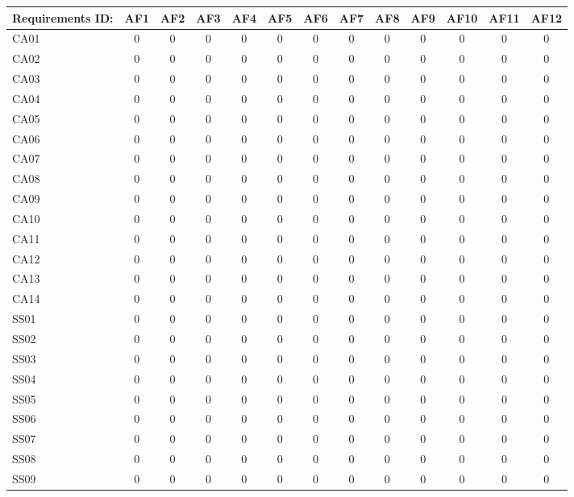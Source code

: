 \documentclass [10pt]{article}
\begin{document}
\begin{longtable}{ | p{} | c | c | c | c | c | c | c | c | c | c | c | c | }
\hline
	Requirements ID: & AF1 & AF2 & AF3 & AF4 & AF5 & AF6 & AF7 & AF8 & AF9 & AF10 & AF11 & AF12 \\ \hline
	CA01 & 0 & 0 & 0 & 0 & 0 & 0 & 0 & 0 & 0 & 0 & 0 & 0 \\ \hline
	CA02 & 0 & 0 & 0 & 0 & 0 & 0 & 0 & 0 & 0 & 0 & 0 & 0 \\ \hline
	CA03 & 0 & 0 & 0 & 0 & 0 & 0 & 0 & 0 & 0 & 0 & 0 & 0 \\ \hline
	CA04 & 0 & 0 & 0 & 0 & 0 & 0 & 0 & 0 & 0 & 0 & 0 & 0 \\ \hline
	CA05 & 0 & 0 & 0 & 0 & 0 & 0 & 0 & 0 & 0 & 0 & 0 & 0 \\ \hline
	CA06 & 0 & 0 & 0 & 0 & 0 & 0 & 0 & 0 & 0 & 0 & 0 & 0 \\ \hline
	CA07 & 0 & 0 & 0 & 0 & 0 & 0 & 0 & 0 & 0 & 0 & 0 & 0 \\ \hline
	CA08 & 0 & 0 & 0 & 0 & 0 & 0 & 0 & 0 & 0 & 0 & 0 & 0 \\ \hline
	CA09 & 0 & 0 & 0 & 0 & 0 & 0 & 0 & 0 & 0 & 0 & 0 & 0 \\ \hline
	CA10 & 0 & 0 & 0 & 0 & 0 & 0 & 0 & 0 & 0 & 0 & 0 & 0 \\ \hline
	CA11 & 0 & 0 & 0 & 0 & 0 & 0 & 0 & 0 & 0 & 0 & 0 & 0 \\ \hline
	CA12 & 0 & 0 & 0 & 0 & 0 & 0 & 0 & 0 & 0 & 0 & 0 & 0 \\ \hline
	CA13 & 0 & 0 & 0 & 0 & 0 & 0 & 0 & 0 & 0 & 0 & 0 & 0 \\ \hline
	CA14 & 0 & 0 & 0 & 0 & 0 & 0 & 0 & 0 & 0 & 0 & 0 & 0 \\ \hline
	SS01 & 0 & 0 & 0 & 0 & 0 & 0 & 0 & 0 & 0 & 0 & 0 & 0 \\ \hline
	SS02 & 0 & 0 & 0 & 0 & 0 & 0 & 0 & 0 & 0 & 0 & 0 & 0 \\ \hline
	SS03 & 0 & 0 & 0 & 0 & 0 & 0 & 0 & 0 & 0 & 0 & 0 & 0 \\ \hline
	SS04 & 0 & 0 & 0 & 0 & 0 & 0 & 0 & 0 & 0 & 0 & 0 & 0 \\ \hline
	SS05 & 0 & 0 & 0 & 0 & 0 & 0 & 0 & 0 & 0 & 0 & 0 & 0 \\ \hline
	SS06 & 0 & 0 & 0 & 0 & 0 & 0 & 0 & 0 & 0 & 0 & 0 & 0 \\ \hline
	SS07 & 0 & 0 & 0 & 0 & 0 & 0 & 0 & 0 & 0 & 0 & 0 & 0 \\ \hline
	SS08 & 0 & 0 & 0 & 0 & 0 & 0 & 0 & 0 & 0 & 0 & 0 & 0 \\ \hline
	SS09 & 0 & 0 & 0 & 0 & 0 & 0 & 0 & 0 & 0 & 0 & 0 & 0 \\ \hline

\end{longtable}
\end{document}

